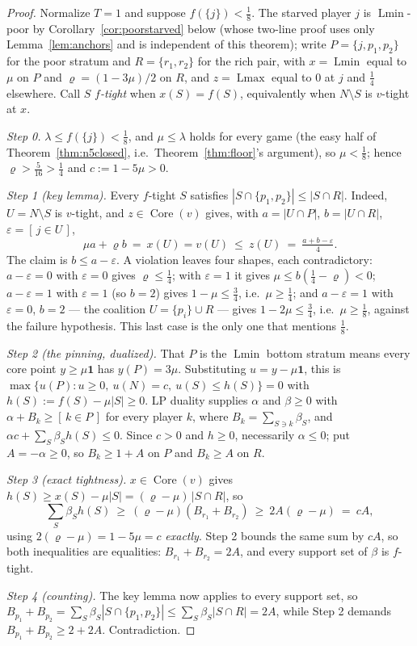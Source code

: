 \documentclass[11pt]{article}
\newcommand{\core}{\operatorname{Core}}
\newcommand{\Lmin}{\operatorname{Lmin}}
\newcommand{\Lmax}{\operatorname{Lmax}}
\newcommand{\one}{\mathbf 1}
\begin{document}
\begin{proof}
Normalize $T=1$ and suppose $f(\{j\})<\tfrac18$.  The starved player $j$ is
$\Lmin$-poor by Corollary~\ref{cor:poorstarved} below (whose two-line proof
uses only Lemma~\ref{lem:anchors} and is independent of this theorem);
write $P=\{j,p_1,p_2\}$ for the poor stratum and $R=\{r_1,r_2\}$ for the
rich pair, with $x=\Lmin$ equal to $\mu$ on $P$ and
$\varrho=(1-3\mu)/2$ on $R$, and $z=\Lmax$ equal to $0$ at $j$ and
$\tfrac14$ elsewhere.  Call $S$ \emph{$f$-tight} when $x(S)=f(S)$,
equivalently when $N\setminus S$ is $v$-tight at $x$.

\emph{Step 0.}  $\lambda\le f(\{j\})<\tfrac18$, and $\mu\le\lambda$ holds
for every game (the easy half of Theorem~\ref{thm:n5closed}, i.e.\
Theorem~\ref{thm:floor}'s argument), so $\mu<\tfrac18$; hence
$\varrho>\tfrac5{16}>\tfrac14$ and $c:=1-5\mu>0$.

\emph{Step 1 (key lemma).}  Every $f$-tight $S$ satisfies
$|S\cap\{p_1,p_2\}|\le|S\cap R|$.  Indeed, $U=N\setminus S$ is $v$-tight,
and $z\in\core(v)$ gives, with $a=|U\cap P|$, $b=|U\cap R|$,
$\varepsilon=[\,j\in U\,]$,
\[
 \mu a+\varrho b\ =\ x(U)=v(U)\ \le\ z(U)\ =\ \tfrac{a+b-\varepsilon}4 .
\]
The claim is $b\le a-\varepsilon$.  A violation leaves four shapes, each
contradictory: $a-\varepsilon=0$ with $\varepsilon=0$ gives
$\varrho\le\tfrac14$; with $\varepsilon=1$ it gives
$\mu\le b(\tfrac14-\varrho)<0$; $a-\varepsilon=1$ with $\varepsilon=1$
(so $b=2$) gives $1-\mu\le\tfrac34$, i.e.\ $\mu\ge\tfrac14$; and
$a-\varepsilon=1$ with $\varepsilon=0$, $b=2$ --- the coalition
$U=\{p_i\}\cup R$ --- gives $1-2\mu\le\tfrac34$, i.e.\ $\mu\ge\tfrac18$,
against the failure hypothesis.  This last case is the only one that
mentions $\tfrac18$.

\emph{Step 2 (the pinning, dualized).}  That $P$ is the $\Lmin$ bottom
stratum means every core point $y\ge\mu\one$ has $y(P)=3\mu$.
Substituting $u=y-\mu\one$, this is
$\max\{u(P):u\ge0,\ u(N)=c,\ u(S)\le h(S)\}=0$ with
$h(S):=f(S)-\mu|S|\ge0$.  LP duality supplies $\alpha$ and $\beta\ge0$
with $\alpha+B_k\ge[\,k\in P\,]$ for every player $k$, where
$B_k=\sum_{S\ni k}\beta_S$, and $\alpha c+\sum_S\beta_Sh(S)\le0$.  Since
$c>0$ and $h\ge0$, necessarily $\alpha\le0$; put $A=-\alpha\ge0$, so
$B_k\ge1+A$ on $P$ and $B_k\ge A$ on $R$.

\emph{Step 3 (exact tightness).}  $x\in\core(v)$ gives
$h(S)\ge x(S)-\mu|S|=(\varrho-\mu)\,|S\cap R|$, so
\[
 \sum_S\beta_Sh(S)\ \ge\ (\varrho-\mu)(B_{r_1}+B_{r_2})\ \ge\
 2A(\varrho-\mu)\ =\ cA,
\]
using $2(\varrho-\mu)=1-5\mu=c$ \emph{exactly}.  Step 2 bounds the same
sum by $cA$, so both inequalities are equalities: $B_{r_1}+B_{r_2}=2A$,
and every support set of $\beta$ is $f$-tight.

\emph{Step 4 (counting).}  The key lemma now applies to every support
set, so
$B_{p_1}+B_{p_2}=\sum_S\beta_S|S\cap\{p_1,p_2\}|
\le\sum_S\beta_S|S\cap R|=2A$, while Step 2 demands
$B_{p_1}+B_{p_2}\ge2+2A$.  Contradiction.
\end{proof}
\end{document}
